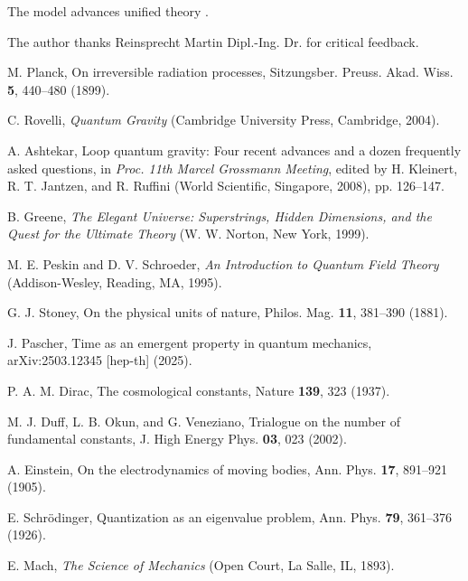 \documentclass[twocolumn,aps,prl]{revtex4-2}
\begin{document}
	The model advances unified theory \cite{Weinberg1992}.
	
	\begin{acknowledgments}
		The author thanks Reinsprecht Martin Dipl.-Ing. Dr. for critical feedback.
	\end{acknowledgments}
	
	\begin{thebibliography}{99}
		
		 M. Planck, On irreversible radiation processes, Sitzungsber. Preuss. Akad. Wiss. \textbf{5}, 440--480 (1899).
		
		 C. Rovelli, \textit{Quantum Gravity} (Cambridge University Press, Cambridge, 2004).
		
		 A. Ashtekar, Loop quantum gravity: Four recent advances and a dozen frequently asked questions, in \textit{Proc. 11th Marcel Grossmann Meeting}, edited by H. Kleinert, R. T. Jantzen, and R. Ruffini (World Scientific, Singapore, 2008), pp. 126--147.
		
		 B. Greene, \textit{The Elegant Universe: Superstrings, Hidden Dimensions, and the Quest for the Ultimate Theory} (W. W. Norton, New York, 1999).
		
		 M. E. Peskin and D. V. Schroeder, \textit{An Introduction to Quantum Field Theory} (Addison-Wesley, Reading, MA, 1995).
		
		 G. J. Stoney, On the physical units of nature, Philos. Mag. \textbf{11}, 381--390 (1881).
		
		 J. Pascher, Time as an emergent property in quantum mechanics, arXiv:2503.12345 [hep-th] (2025).
		
		 P. A. M. Dirac, The cosmological constants, Nature \textbf{139}, 323 (1937).
		
		 M. J. Duff, L. B. Okun, and G. Veneziano, Trialogue on the number of fundamental constants, J. High Energy Phys. \textbf{03}, 023 (2002).
		
		 A. Einstein, On the electrodynamics of moving bodies, Ann. Phys. \textbf{17}, 891--921 (1905).
		
		 E. Schrödinger, Quantization as an eigenvalue problem, Ann. Phys. \textbf{79}, 361--376 (1926).
		
		 E. Mach, \textit{The Science of Mechanics} (Open Court, La Salle, IL, 1893).
		

\end{thebibliography}
\end{document}
